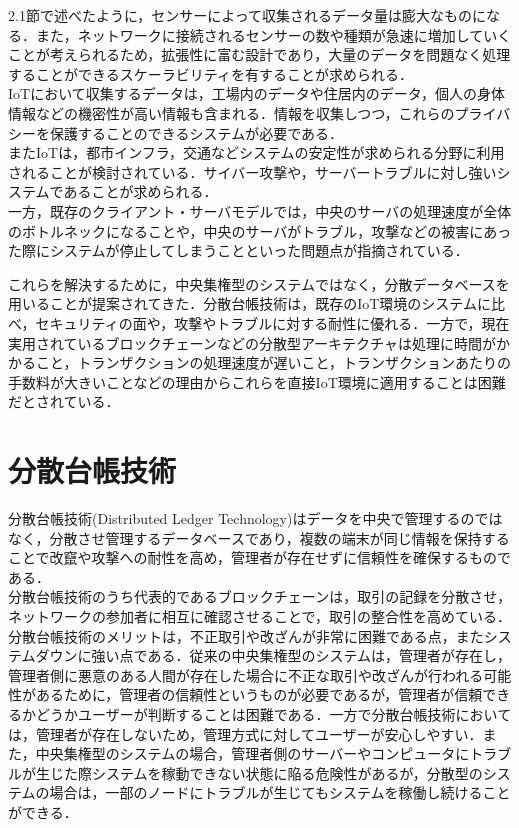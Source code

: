 \documentclass[japanese, macos]{KU2}
\begin{document}
2.1節で述べたように，センサーによって収集されるデータ量は膨大なものになる．また，ネットワークに接続されるセンサーの数や種類が急速に増加していくことが考えられるため，拡張性に富む設計であり，大量のデータを問題なく処理することができるスケーラビリティを有することが求められる．\\
IoTにおいて収集するデータは，工場内のデータや住居内のデータ，個人の身体情報などの機密性が高い情報も含まれる．情報を収集しつつ，これらのプライバシーを保護することのできるシステムが必要である．\\
またIoTは，都市インフラ，交通などシステムの安定性が求められる分野に利用されることが検討されている．サイバー攻撃や，サーバートラブルに対し強いシステムであることが求められる．\\
一方，既存のクライアント・サーバモデルでは，中央のサーバの処理速度が全体のボトルネックになることや，中央のサーバがトラブル，攻撃などの被害にあった際にシステムが停止してしまうことといった問題点が指摘されている．

これらを解決するために，中央集権型のシステムではなく，分散データベースを用いることが提案されてきた．分散台帳技術は，既存のIoT環境のシステムに比べ，セキュリティの面や，攻撃やトラブルに対する耐性に優れる．一方で，現在実用されているブロックチェーンなどの分散型アーキテクチャは処理に時間がかかること，トランザクションの処理速度が遅いこと，トランザクションあたりの手数料が大きいことなどの理由からこれらを直接IoT環境に適用することは困難だとされている．\\


\section{分散台帳技術}

分散台帳技術(Distributed Ledger Technology)はデータを中央で管理するのではなく，分散させ管理するデータベースであり，複数の端末が同じ情報を保持することで改竄や攻撃への耐性を高め，管理者が存在せずに信頼性を確保するものである．\\
分散台帳技術のうち代表的であるブロックチェーンは，取引の記録を分散させ，ネットワークの参加者に相互に確認させることで，取引の整合性を高めている．\\
分散台帳技術のメリットは，不正取引や改ざんが非常に困難である点，またシステムダウンに強い点である．従来の中央集権型のシステムは，管理者が存在し，管理者側に悪意のある人間が存在した場合に不正な取引や改ざんが行われる可能性があるために，管理者の信頼性というものが必要であるが，管理者が信頼できるかどうかユーザーが判断することは困難である．一方で分散台帳技術においては，管理者が存在しないため，管理方式に対してユーザーが安心しやすい．また，中央集権型のシステムの場合，管理者側のサーバーやコンピュータにトラブルが生じた際システムを稼動できない状態に陥る危険性があるが，分散型のシステムの場合は，一部のノードにトラブルが生じてもシステムを稼働し続けることができる．\\
\end{document}
